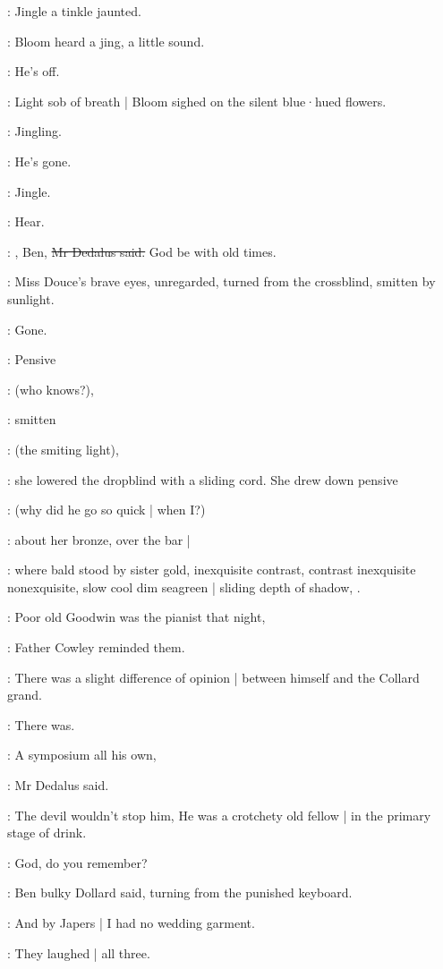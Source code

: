 :
Jingle a tinkle jaunted.

:
Bloom heard a jing,
a little sound.

\BloomInt:
He's off.

:
Light sob of breath |
Bloom sighed on the silent blue·hued flowers.

:
Jingling.

\BloomInt:
He's gone.

:
Jingle.

\BloomInt:
Hear.

\simon:
, Ben,
\sout{Mr Dedalus said.}
God be with old times.

:
Miss Douce's brave eyes,
unregarded,
turned from the crossblind,
smitten by sunlight.

\MissDInt:
Gone.

:
Pensive

\MissDInt:
(who knows?),

:
smitten

\MissDInt:
(the smiting light),

:
she lowered the dropblind with a sliding cord.
She drew down pensive

\MissDInt:
(why did he go so quick |
when I?)

:
about her bronze,
over the bar |

:
where bald stood by sister gold,
inexquisite contrast,
contrast inexquisite nonexquisite,
slow cool dim seagreen |
sliding depth of shadow,
.

\cowley:
Poor old Goodwin was the pianist that night,

:
Father Cowley reminded them.

\cowley:
There was a slight difference of opinion |
between himself and the Collard grand.

:
There was.

\simon:
A symposium all his own,

:
Mr Dedalus said.

\simon:
The devil wouldn't stop him,
He was a crotchety old fellow |
in the primary stage of drink.

\dollard:
God,
do you remember?

:
Ben bulky Dollard said,
turning from the punished keyboard.

\dollard:
And by Japers |
I had no wedding garment.

:
They laughed |
all three.

